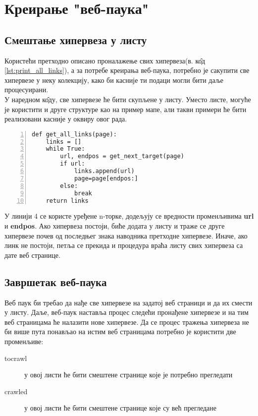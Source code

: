 \section{Креирање "веб-паука"}    
	\subsection{Смештање хипервеза у листу}
	Користећи претходно описано проналажење свих хипервеза(в. к\^{о}д \ref{lst:print_all_links}), а за потребе креирања веб-паука, потребно је сакупити све хипервезе у неку колекцију, како би касније ти подаци могли бити даље процесуирани. \\
	
		У наредном к\^{о}ду, све хипервезе ће бити скупљене у листу. Уместо листе, могуће је користити и друге структуре као на пример мапе, али такви примери ће бити реализовани касније у оквиру овог рада.  
		\begin{lstlisting}[caption=Процедура смештања свих хиперлинкова у листу, label={lst:getalllinks}, numbers=left]
def get_all_links(page):
    links = []
    while True:
        url, endpos = get_next_target(page)
        if url:
            links.append(url)
            page=page[endpos:]
        else:
            break
    return links
		\end{lstlisting}
		У линији 4 се користе уређене n-торке, додељују се вредности променљивима \textbf{url} и \textbf{endpos}. Ако хипервеза постоји, биће додата у листу и траже се друге хипервезе почев од последњег знака наводника претходне хипервезе. Иначе, ако линк не постоји, петља се прекида и процедура враћа листу свих хипервеза са дате веб странице.
	\subsection{Завршетак веб-паука}
	Веб паук би требао да нађе све хипервезе на задатој веб страници и да их смести у листу. Даље, веб-паук наставља процес следећи пронађене хипервезе и на тим веб страницама ће налазити нове хипервезе. Да се процес тражења хипервеза не би више пута понављао на истим веб страницама потребно је користити две променљиве:
	\begin{description}
	\item[tocrawl] у овој листи ће бити смештене странице које је потребно прегледати 
	\item[crawled] у овој листи ће бити смештене странице које су већ прегледане
	\end{description}
